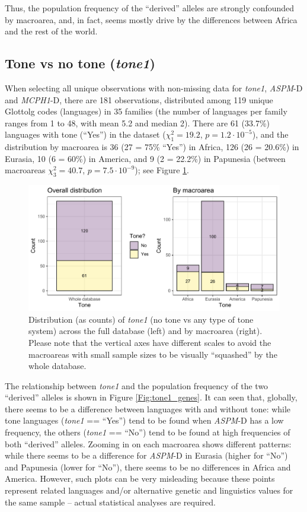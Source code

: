 \documentclass[twoside,twocolumn]{article}
\begin{document}
Thus, the population frequency of the ``derived'' alleles are strongly confounded by macroarea, and, in fact, seems mostly drive by the differences between Africa and the rest of the world.


\subsection{Tone vs no tone (\textit{tone1})}

When selecting all unique observations with non-missing data for \textit{tone1}, \textit{ASPM}-D and \textit{MCPH1}-D, there are 181 observations, distributed among 119 unique Glottolg codes (languages) in 35 families (the number of languages per family ranges from 1 to 48, with mean 5.2 and median 2).
There are 61 (33.7\%) languages with tone (``Yes'') in the dataset ($\chi^2_{1} = 19.2$, $p = 1.2\cdot10^{-5}$), and the distribution by macroarea is 36 (27 = 75\% ``Yes'') in Africa, 126 (26 = 20.6\%) in Eurasia, 10 (6 = 60\%) in America, and 9 (2 = 22.2\%) in Papunesia (between macroareas $\chi^2_{3} = 40.7$, $p = 7.5\cdot10^{-9}$); see Figure \ref{Fig:tone1_distribution}.

\begin{figure}[h]
  \centering
  \includegraphics[width=\textwidth]{../../code/figures/tone1_distribution}
  \caption{Distribution (as counts) of \textit{tone1} (no tone vs any type of tone system) across the full database (left) and by macroarea (right). Please note that the vertical axes have different scales to avoid the macroareas with small sample sizes to be visually ``squashed'' by the whole database.}
  \label{Fig:tone1_distribution}
\end{figure}

The relationship between \textit{tone1} and the population frequency of the two ``derived'' alleles is shown in Figure \ref{Fig:tone1_genes}.
It can seen that, globally, there seems to be a difference between languages with and without tone: while tone languages (\textit{tone1} == ``Yes'') tend to be found when \textit{ASPM}-D has a low frequency, the others (\textit{tone1} == ``No'') tend to be found at high frequencies of both ``derived'' alleles.
Zooming in on each macroarea shows different patterns: while there seems to be a difference for \textit{ASPM}-D in Eurasia (higher for ``No'') and Papunesia (lower for ``No''), there seems to be no differences in Africa and America.
However, such plots can be very misleading because these points represent related languages and/or alternative genetic and linguistics values for the same sample -- actual statistical analyses are required.
\end{document}
